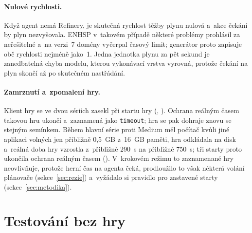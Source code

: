 \paragraph{Nulové rychlosti.} Když agent nemá Refinery, je skutečná rychlost těžby plynu nulová a~akce čekání by plyn nezvyšovala. ENHSP v~takovém případě některé problémy prohlásil za neřešitelné a~na verzi~7 domény vyčerpal časový limit; generátor proto zapisuje obě rychlosti nejméně jako~1. Jedna jednotka plynu za pět sekund je zanedbatelná chyba modelu, kterou vykonávací vrstva vyrovná, protože čekání na plyn skončí až po skutečném nastřádání.

\paragraph{Zamrznutí a~zpomalení hry.} Klient hry se ve dvou sériích zasekl při startu hry (, ). Ochrana reálným časem takovou hru ukončí a~zaznamená jako \texttt{timeout}; hra se pak dohraje znovu se stejným semínkem. Během hlavní série proti Medium měl počítač kvůli jiné aplikaci volných jen přibližně 0,5~GB z~16~GB paměti, hra odkládala na disk a~reálná doba hry vzrostla z~přibližně 290~s na přibližně 750~s; tři starty proto ukončila ochrana reálným časem (). V~krokovém režimu to zaznamenané hry neovlivňuje, protože herní čas na agenta čeká, prodloužilo to však některá volání plánovače (sekce~\ref{sec:rezie}) a~vyžádalo si pravidlo pro zastavené starty (sekce~\ref{sec:metodika}).

\section{Testování bez hry}
\label{sec:testovani}

